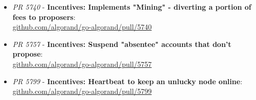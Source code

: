 \documentclass[11pt,a4paper]{article}
\begin{document}
\begin{itemize}
    \item \emph{PR 5740} - \textbf{Incentives: Implements "Mining" - diverting a portion of fees to proposers}:\\
          \href{https://github.com/algorand/go-algorand/pull/5740}{github.com/algorand/go-algorand/pull/5740} \\
    \item \emph{PR 5757} - \textbf{Incentives: Suspend "absentee" accounts that don't propose}:\\
          \href{https://github.com/algorand/go-algorand/pull/5757}{github.com/algorand/go-algorand/pull/5757} \\
    \item \emph{PR 5799} - \textbf{Incentives: Heartbeat to keep an unlucky node online}:\\
          \href{https://github.com/algorand/go-algorand/pull/5799}{github.com/algorand/go-algorand/pull/5799}
\end{itemize}

\pagebreak

\printglossaries

\pagebreak
\end{document}
